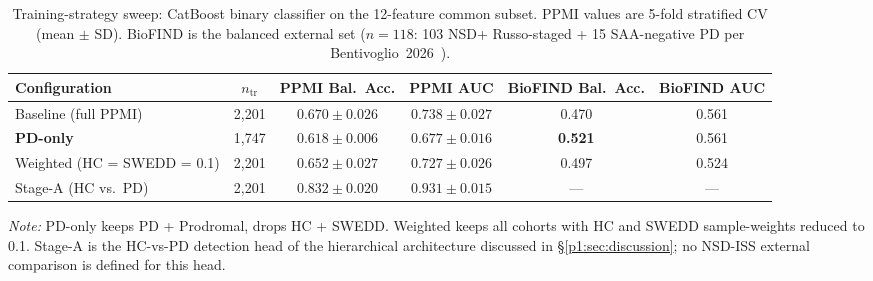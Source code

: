 \begin{table}[!t]
\caption{Training-strategy sweep: CatBoost binary classifier on the 12-feature common subset. PPMI values are 5-fold stratified CV (mean $\pm$ SD). BioFIND is the balanced external set ($n{=}118$: 103 NSD+ Russo-staged + 15 SAA-negative PD per Bentivoglio~2026~\cite{bentivoglio2026saaneg}).}
\label{p1:tab:pdonly}
\centering
\footnotesize
\setlength{\tabcolsep}{3.5pt}
\begin{tabular}{@{}lccccc@{}}
\toprule
\textbf{Configuration} & \textbf{$n_{\mathrm{tr}}$} & \textbf{PPMI Bal.\ Acc.} & \textbf{PPMI AUC} & \textbf{BioFIND Bal.\ Acc.} & \textbf{BioFIND AUC} \\
\midrule
Baseline (full PPMI)      & 2{,}201 & $0.670 \pm 0.026$ & $0.738 \pm 0.027$ & 0.470 & 0.561 \\
\textbf{PD-only}          & 1{,}747 & $0.618 \pm 0.006$ & $0.677 \pm 0.016$ & \textbf{0.521} & 0.561 \\
Weighted (HC = SWEDD = 0.1) & 2{,}201 & $0.652 \pm 0.027$ & $0.727 \pm 0.026$ & 0.497 & 0.524 \\
\midrule
Stage-A (HC vs.\ PD)      & 2{,}201 & $\mathbf{0.832 \pm 0.020}$ & $\mathbf{0.931 \pm 0.015}$ & --- & --- \\
\bottomrule
\end{tabular}
\vspace{2pt}

\raggedright\scriptsize\textit{Note:} PD-only keeps PD + Prodromal, drops HC + SWEDD. Weighted keeps all cohorts with HC and SWEDD sample-weights reduced to 0.1. Stage-A is the HC-vs-PD detection head of the hierarchical architecture discussed in \S\ref{p1:sec:discussion}; no NSD-ISS external comparison is defined for this head.
\end{table}

